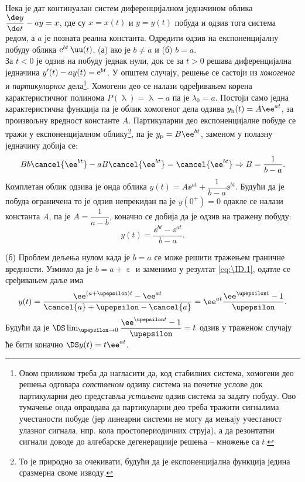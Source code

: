 \PID Нека је дат континуалан систем диференцијалном једначином облика 
${\dfrac{\de y}{\de t} - ay = x}$, где су $x=x(t)$ и $y=y(t)$ побуда и одзив тога система редом, а $a$ је позната
реална константа. Одредити одзив на експоненцијалну побуду облика 
${\rm e}^{bt} \, \uu(t)$, (а) ако је $b \neq a$ и (б) $b = a$. \\[5mm]

\RESENJE  За $t < 0$ је одзив на побуду једнак нули, док се 
за $t > 0$ решава диференцијална једначина 
${y'(t) - ay(t)  = {\rm e}^{bt}}$. У општем случају, решење се састоји из 
\textit{хомогеног} и \textit{партикуларног} дела\footnote{Овом приликом треба да нагласити 
да, код стабилних система, хомогени део решења одговара \textit{сопственом} одзиву система на почетне услове
док партикуларни део представља \textit{устаљени} одзив система за задату побуду. Ово тумачење онда оправдава
да партикуларни део треба тражити сигналима учестаности побуде (јер линеарни системи не могу да мењају учестаност 
улазног сигнала, нпр. кола простопериодичних струја), а да резонтатни сигнали доводе 
до алгебарске дегенерациије решења -- множење са $t$.}. Хомогени део се налази одређивањем корена 
карактеристичног полинома $P(\uplambda) = \uplambda - a$ па је $\lambda_0 = a$. Постоји само 
једна карактеристична функција па је облик хомогеног дела одзива 
$y_{\rm h}(t) = A \ee^{at}$, за произвољну вредност константе $A$. Партикуларни део експоненцијалне побуде се тражи у 
експоненцијалном облику\footnote{То је природно за очекивати, будући да је експоненцијална функција
једина сразмерна своме изводу.}, па је $y_{\rm p} = B\ee^{bt}$, заменом у полазну једначину добија се:
\begin{equation}
    Bb\cancel{\ee^{bt}} - aB\cancel{\ee^{bt}} = \cancel{\ee^{bt}} \Rightarrow
    B = \dfrac{1}{b - a}.
\end{equation}
Комплетан облик одзива је онда облика $y(t) = A\ee^{at} + \dfrac{1}{b-a} \ee^{bt}$. Будући да је
побуда ограничена то је одзив непрекидан па је $y(0^+) = 0$ одакле се налази константа $A$, 
па је $A = \dfrac{1}{a - b}$, коначно се добија да је одзив на тражену побуду:
\begin{equation}
    y(t) = \dfrac{\ee^{bt} - \ee^{at}}{b - a}.
    \label{eq:\ID.1}
\end{equation}

(б) 
Проблем дељења нулом када је $b=a$ се може решити тражењем граничне вредности. 
Узмимо да је $b = a + \upepsilon$ 
и заменимо у резултат \ref{eq:\ID.1}, одатле се сређивањем даље има
\begin{equation}
    y(t) = \dfrac{\ee^{(a + \upepsilon)t} - \ee^{at}}{\cancel{a} + \upepsilon - \cancel{a}} = 
    \ee^{at} \dfrac{\ee^{\upepsilon t} - 1}{\upepsilon}.
\end{equation}
Будући да је $\DS \lim_{\upepsilon\to 0} \dfrac{\ee^{\upepsilon t} - 1}{\upepsilon} = t$ одзив
у траженом случају ће бити коначно 
$\DS y(t) = t \ee^{at}$.

